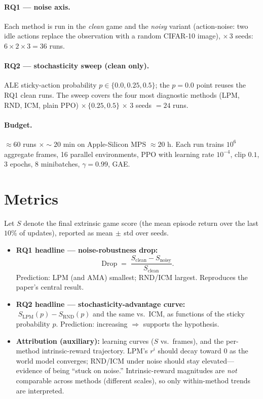 \documentclass[11pt]{article}
\newcommand{\score}{S}
\begin{document}
\paragraph{RQ1 --- noise axis.} Each method is run in the \emph{clean} game and the \emph{noisy}
variant (action-noise: two idle actions replace the observation with a random CIFAR-10 image),
\(\times\,3\) seeds: \(6\times2\times3 = 36\) runs.

\paragraph{RQ2 --- stochasticity sweep (clean only).} ALE sticky-action probability
\(p \in \{0.0, 0.25, 0.5\}\); the \(p=0.0\) point reuses the RQ1 clean runs. The sweep covers the
four most diagnostic methods (LPM, RND, ICM, plain PPO) \(\times\,\{0.25,0.5\}\,\times\,3\) seeds
\(=24\) runs.

\paragraph{Budget.} \(\approx 60\) runs \(\times \sim\!20\) min on Apple-Silicon MPS
\(\approx 20\) h. Each run trains \(10^{6}\) aggregate frames, 16 parallel environments, PPO with
learning rate \(10^{-4}\), clip \(0.1\), 3 epochs, 8 minibatches, \(\gamma=0.99\), GAE.

\section{Metrics}
Let \(\score\) denote the final extrinsic game score (the mean episode return over the last
\(10\%\) of updates), reported as mean\(\,\pm\,\)std over seeds.

\begin{itemize}[leftmargin=1.4em]
  \item \textbf{RQ1 headline --- noise-robustness drop:}
  \begin{equation}
    \mathrm{Drop} \;=\; \frac{\score_{\mathrm{clean}} - \score_{\mathrm{noisy}}}{\score_{\mathrm{clean}}}.
  \end{equation}
  Prediction: LPM (and AMA) smallest; RND/ICM largest. Reproduces the paper's central result.
  \item \textbf{RQ2 headline --- stochasticity-advantage curve:}
  \(\;\score_{\mathrm{LPM}}(p) - \score_{\mathrm{RND}}(p)\) and the same vs.\ ICM, as functions of
  the sticky probability \(p\). Prediction: increasing \(\Rightarrow\) supports the hypothesis.
  \item \textbf{Attribution (auxiliary):} learning curves (\(\score\) vs.\ frames), and the
  per-method intrinsic-reward trajectory. LPM's \(r^{i}\) should decay toward \(0\) as the world
  model converges; RND/ICM under noise should stay elevated---evidence of being ``stuck on noise.''
  Intrinsic-reward magnitudes are \emph{not} comparable across methods (different scales), so only
  within-method trends are interpreted.
\end{itemize}
\end{document}
